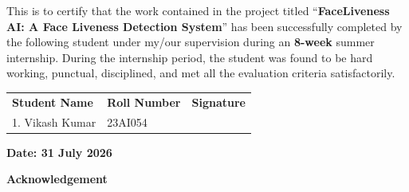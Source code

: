 \documentclass[12pt,a4paper,oneside]{article}
\begin{document}
\vspace{1cm}
\noindent This is to certify that the work contained in the project titled ``\textbf{FaceLiveness AI: A Face Liveness Detection System}'' has been successfully completed by the following student under my/our supervision during an \textbf{8-week} summer internship. During the internship period, the student was found to be hard working, punctual, disciplined, and met all the evaluation criteria satisfactorily.

\vspace{2cm}
\noindent
\begin{tabular}{p{5cm}p{5cm}p{5cm}}
\textbf{Student Name} & \textbf{Roll Number} & \textbf{Signature} \\[0.5cm]
1. Vikash Kumar & 23AI054 & \dotfill \\
\end{tabular}

\vspace{3cm}
\begin{flushright}
\end{flushright}

\vspace{1.5cm}
\noindent \textbf{Date: 31 July 2026} 

\newpage

\vspace*{0.5cm}
\begin{center}
{\Large \textbf{Acknowledgement}}
\end{center}
\vspace{0.8cm}
\end{document}
